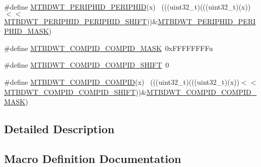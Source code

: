\begin{DoxyCompactItemize}
\item 
\#define \hyperlink{group___m_t_b_d_w_t___register___masks_ga0fcfc93024f0b323172a0245cfe76818}{M\+T\+B\+D\+W\+T\+\_\+\+P\+E\+R\+I\+P\+H\+I\+D\+\_\+\+P\+E\+R\+I\+P\+H\+ID}(x)                        ~(((uint32\+\_\+t)(((uint32\+\_\+t)(x))$<$$<$\hyperlink{group___m_t_b_d_w_t___register___masks_gaa9dfe45d3ebe7c1496f24e1b898ae6a5}{M\+T\+B\+D\+W\+T\+\_\+\+P\+E\+R\+I\+P\+H\+I\+D\+\_\+\+P\+E\+R\+I\+P\+H\+I\+D\+\_\+\+S\+H\+I\+FT}))\&\hyperlink{group___m_t_b_d_w_t___register___masks_gaa49f29267dcedd6db6aafce7b226182b}{M\+T\+B\+D\+W\+T\+\_\+\+P\+E\+R\+I\+P\+H\+I\+D\+\_\+\+P\+E\+R\+I\+P\+H\+I\+D\+\_\+\+M\+A\+SK})
\item 
\#define \hyperlink{group___m_t_b_d_w_t___register___masks_ga6b80c05493bf46a1572b3f25fda4764b}{M\+T\+B\+D\+W\+T\+\_\+\+C\+O\+M\+P\+I\+D\+\_\+\+C\+O\+M\+P\+I\+D\+\_\+\+M\+A\+SK}~0x\+F\+F\+F\+F\+F\+F\+F\+Fu
\item 
\#define \hyperlink{group___m_t_b_d_w_t___register___masks_ga26fe709d00d1433ca5a041dc307adfaa}{M\+T\+B\+D\+W\+T\+\_\+\+C\+O\+M\+P\+I\+D\+\_\+\+C\+O\+M\+P\+I\+D\+\_\+\+S\+H\+I\+FT}~0
\item 
\#define \hyperlink{group___m_t_b_d_w_t___register___masks_ga08b9043ddbb7b805947ba6b5717fc54d}{M\+T\+B\+D\+W\+T\+\_\+\+C\+O\+M\+P\+I\+D\+\_\+\+C\+O\+M\+P\+ID}(x)                                ~(((uint32\+\_\+t)(((uint32\+\_\+t)(x))$<$$<$\hyperlink{group___m_t_b_d_w_t___register___masks_ga26fe709d00d1433ca5a041dc307adfaa}{M\+T\+B\+D\+W\+T\+\_\+\+C\+O\+M\+P\+I\+D\+\_\+\+C\+O\+M\+P\+I\+D\+\_\+\+S\+H\+I\+FT}))\&\hyperlink{group___m_t_b_d_w_t___register___masks_ga6b80c05493bf46a1572b3f25fda4764b}{M\+T\+B\+D\+W\+T\+\_\+\+C\+O\+M\+P\+I\+D\+\_\+\+C\+O\+M\+P\+I\+D\+\_\+\+M\+A\+SK})
\end{DoxyCompactItemize}


\subsection{Detailed Description}


\subsection{Macro Definition Documentation}
